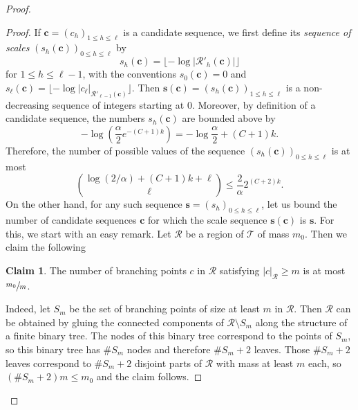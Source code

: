\documentclass[JEP,XML,SOM,Unicode,NoFloatCountersInSection,published]{cedram}
\let\backslash\setminus
\newcommand{\Rr}{\mathcal{R}}
\theoremstyle{plain}
\theoremstyle{definition}
\newtheorem*{claim*}{Claim}
\begin{document}
\begin{proof}
\begin{proof}
If $\mathbf{c}=(c_h)_{1 \leq h \leq \ell}$ is a candidate sequence, we first define its \emph{sequence of scales} $\left( s_h(\mathbf{c}) \right)_{0 \leq h \leq \ell}$ by
\[ s_h(\mathbf{c}) = \lfloor -\log \left| \Rr'_h(\mathbf{c}) \right| \rfloor \]
for $1 \leq h \leq \ell-1$, with the conventions $s_0(\mathbf{c})=0$ and $s_{\ell}(\mathbf{c})=\lfloor -\log |c_{\ell}|_{\Rr'_{\ell-1}(\mathbf{c})} \rfloor$.
Then $\mathbf{s}(\mathbf{c})=\left( s_h(\mathbf{c}) \right)_{1 \leq h \leq \ell}$ is a non-decreasing sequence of integers starting at $0$.
Moreover, by definition of a candidate sequence, the numbers $s_h(\mathbf{c})$ are bounded above by
\[ -\log \left( \frac{\alpha}{2} e^{-(C+1)k}\right) = -\log \frac{\alpha}{2} + (C+1) k.\]
Therefore, the number of possible values of the sequence $\left( s_h(\mathbf{c}) \right)_{0 \leq h \leq \ell}$ is at most
\begin{equation}\label{eqn_number_scale_sequences}
\binom{\log (2/\alpha) + (C+1)k + \ell}{\ell} \leq \frac{2}{\alpha} 2^{(C+2)k}.
\end{equation}
On the other hand, for any such sequence $\mathbf{s}=(s_h)_{0 \leq h \leq \ell}$, let us bound the number of candidate sequences $\mathbf{c}$ for which the scale sequence $\mathbf{s}(\mathbf{c})$ is $\mathbf{s}$.
For this, we start with an easy remark.
Let $\Rr$ be a region of $\mathcal{T}$ of mass $m_0$.
Then we claim the following
\begin{claim*}
The number of branching points $c$ in $\Rr$ satisfying $|c|_{\Rr} \geq m$ is at most $\sfrac{m_0}{m}$.
\end{claim*}
Indeed, let $S_m$ be the set of branching points of size at least $m$ in $\Rr$.
Then $\Rr$ can be obtained by gluing the connected components of $\Rr \backslash S_m$ along the structure of a finite binary tree.
The nodes of this binary tree correspond to the points of $S_m$, so this binary tree has $\# S_m$ nodes and therefore $\# S_m+2$ leaves.
Those $\# S_m+2$ leaves correspond to $\# S_m+2$ disjoint parts of $\Rr$ with mass at least $m$ each, so $\left( \# S_m+2 \right) m \leq m_0$ and the claim follows.


\end{proof}
\end{proof}
\end{document}
